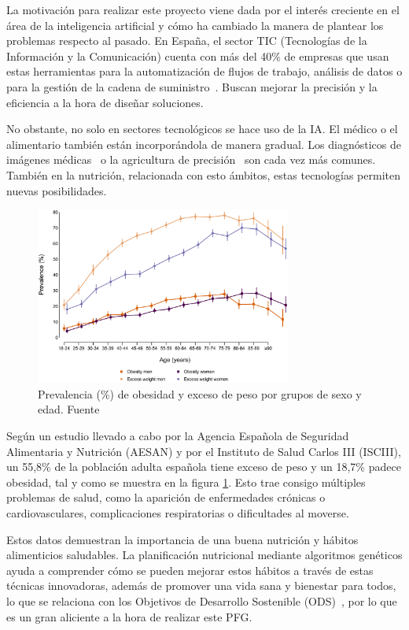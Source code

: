 La motivación para realizar este proyecto viene dada por el interés creciente en el área de la inteligencia artificial y cómo ha cambiado la manera de plantear los problemas respecto al pasado. En España, el sector TIC (Tecnologías de la Información y la Comunicación) cuenta con más del 40\% de empresas que usan estas herramientas para la automatización de flujos de trabajo, análisis de datos o para la gestión de la cadena de suministro~\cite{ontsi2023}. Buscan mejorar la precisión y la eficiencia a la hora de diseñar soluciones.

No obstante, no solo en sectores tecnológicos se hace uso de la IA. El médico o el alimentario también están incorporándola de manera gradual. Los diagnósticos de imágenes médicas~\cite{philips2024} o la agricultura de precisión~\cite{majeed2024} son cada vez más comunes. También en la nutrición, relacionada con esto ámbitos, estas tecnologías permiten nuevas posibilidades.

\begin{figure}[H]
    \centering
    \includegraphics[width=0.75\textwidth]{figures/prevalencia-obesidad.png}
    \caption{Prevalencia (\%) de obesidad y exceso de peso por grupos de sexo y edad. Fuente \cite{ENE-COVID}}
    \label{fig:prevalencia-obesidad}
\end{figure}

Según un estudio llevado a cabo por la Agencia Española de Seguridad Alimentaria y Nutrición (AESAN) y por el Instituto de Salud Carlos III (ISCIII), un 55,8\% de la población adulta española tiene exceso de peso y un 18,7\% padece obesidad, tal y como se muestra en la figura \ref{fig:prevalencia-obesidad}. Esto trae consigo múltiples problemas de salud, como la aparición de enfermedades crónicas o cardiovasculares, complicaciones respiratorias o dificultades al moverse.

Estos datos demuestran la importancia de una buena nutrición y hábitos alimenticios saludables. La planificación nutricional mediante algoritmos genéticos ayuda a comprender cómo se pueden mejorar estos hábitos a través de estas técnicas innovadoras, además de promover una vida sana y bienestar para todos, lo que se relaciona con los Objetivos de Desarrollo Sostenible (ODS)~\cite{ONU2024}, por lo que es un gran aliciente a la hora de realizar este PFG.


